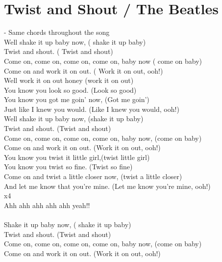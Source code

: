 \section{Twist and Shout / The Beatles}\label{sec:twistandshout}
\Dmajor
\Gmajor
\Aseven

   - Same chords throughout the song\\
Well shake it up baby  now, ( shake it up  baby)\\
Twist and  shout. ( Twist and  shout)\\
Come on, come on, come on, come on,  baby now ( come on  baby)\\
Come on and work it on  out. ( Work it on  out, ooh!)\\
Well work it on out honey (work it on out)\\
You know you look so good. (Look so good)\\
You know you got me goin’ now, (Got me goin’)\\
Just like I knew you would. (Like I knew you would, ooh!)\\
Well shake it up baby now, (shake it up baby)\\
Twist and shout. (Twist and shout)\\
Come on, come on, come on, come on, baby now, (come on baby)\\
Come on and work it on out. (Work it on out, ooh!)\\
You know you twist it little girl,(twist little girl)\\
You know you twist so fine. (Twist so fine)\\
Come on and twist a little closer now, (twist a little closer)\\
And let me know that you’re mine. (Let me know you’re mine, ooh!)\\
    x4\\
 Ahh ahh  ahh ahh ahh yeah!!\\
  \\
Shake it up baby  now, ( shake it up  baby)\\
Twist and shout. (Twist and shout)\\
Come on, come on, come on, come on, baby now, (come on baby)\\
Come on and work it on out. (Work it on out, ooh!)\\
